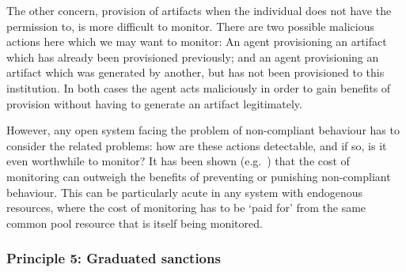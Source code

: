 The other concern, provision of artifacts when the individual does not have the permission to, is more difficult to monitor. There are two possible malicious actions here which we may want to monitor: An agent provisioning an artifact which has already been provisioned previously; and an agent provisioning an artifact which was generated by another, but has not been provisioned to this institution. In both cases the agent acts maliciously in order to gain benefits of provision without having to generate an artifact legitimately. 

However, any open system facing the problem of  non-compliant behaviour has to consider the related problems: how 
are these actions detectable, and if so, is it even worthwhile to monitor? It has been shown (e.g.\ \citet{Balke2013}) that the cost of monitoring
can outweigh the benefits of preventing or punishing non-compliant behaviour. This can be particularly acute in any system
with endogenous resources, where the cost of monitoring has to be `paid for' from the same common pool resource that is
itself being monitored.





\subsubsection*{Principle 5: Graduated sanctions}

